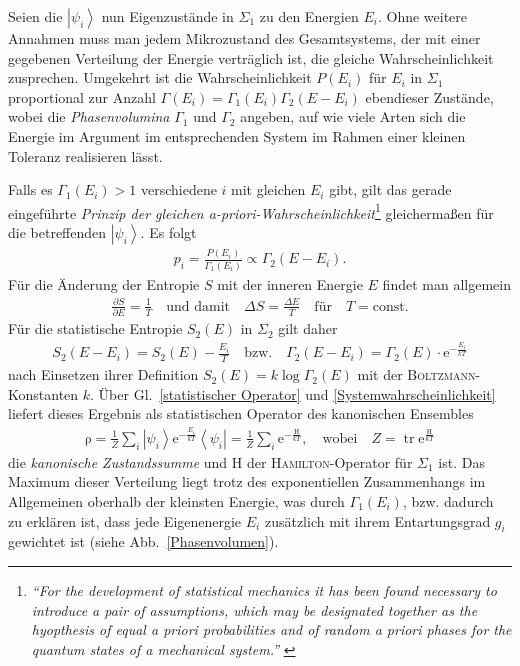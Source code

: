 \documentclass[a4paper, 10pt, twoside, openany]{book} %
\newcommand \bra[1]{\left \langle #1 \right |}
\newcommand \ket[1]{\left | #1 \right \rangle}
\def \E {\mathrm e}
\newcommand \op[1]{\mathrm{#1}}
\newcommand \pdiff[2]{\frac{\partial #1}{\partial #2}}
\begin{document}
Seien die $\ket{\psi_i}$ nun Eigenzustände in $\Sigma_1$ zu den Energien $E_i$. Ohne weitere Annahmen muss man jedem Mikrozustand des Gesamtsystems, der mit einer gegebenen Verteilung der Energie verträglich ist, die gleiche Wahrscheinlichkeit zusprechen. Umgekehrt ist die Wahrscheinlichkeit $P(E_i)$ für $E_i$ in $\Sigma_1$ proportional zur Anzahl $\mathit \Gamma(E_i) = \mathit \Gamma_1(E_i) \mathit \Gamma_2(E - E_i)$ ebendieser Zustände, wobei die \emph{Phasenvolumina} $\mathit \Gamma_1$ und $\mathit \Gamma_2$ angeben, auf wie viele Arten sich die Energie im Argument im entsprechenden System im Rahmen einer kleinen Toleranz realisieren lässt.

Falls es $\Gamma_1(E_i) > 1$ verschiedene $i$ mit gleichen $E_i$ gibt, gilt das gerade eingeführte \emph{Prinzip der gleichen a-priori-Wahrscheinlichkeit}\footnote{\emph{"`For the development of statistical mechanics it has been found necessary to introduce a pair of assumptions, which may be designated together as the hyopthesis of \emph{equal} a priori \emph{probabilities and of random} a priori \emph{phases} for the quantum states of a mechanical system."'} \cite[S.~4]{Tolman}} gleichermaßen für die betreffenden $\ket{\psi_i}$. Es folgt
%
\begin{align}
    p_i = \frac{P(E_i)}{\mathit \Gamma_1(E_i)} \propto \Gamma_2(E - E_i).
    \label{Systemwahrscheinlichkeit}
\end{align}
%
Für die Änderung der Entropie $S$ mit der inneren Energie $E$ findet man allgemein
%
\begin{align*}
    \pdiff S E = \frac 1 T \quad \text{und damit} \quad \Delta S = \frac {\Delta E} T \quad \text{für} \quad T = \text{const.}
\end{align*}
%
Für die statistische Entropie $S_2(E)$ in $\Sigma_2$ gilt daher
%
\begin{align*}
    S_2(E - E_i) = S_2(E) - \frac {E_i} T \quad \text{bzw.} \quad \Gamma_2(E - E_i) = \Gamma_2(E) \cdot \E^{-\frac{E_i}{k T}}
\end{align*}
%
nach Einsetzen ihrer Definition $S_2(E) = k \log \Gamma_2(E)$ mit der \textsc{Boltzmann}-Konstanten $k$. Über Gl.~\ref{statistischer Operator} und \ref{Systemwahrscheinlichkeit} liefert dieses Ergebnis als statistischen Operator des kanonischen Ensembles
%
\begin{align*}
    \op \rho = \frac 1 Z \sum_i \ket{\psi_i} \E^{-\frac{E_i}{k T}} \bra{\psi_i} = \frac 1 Z \sum_i \E^{-\frac{\op H}{k T}}, \quad \text{wobei} \quad Z = \operatorname{tr} \E^{\frac{\op H}{k T}}
\end{align*}
%
die \emph{kanonische Zustandssumme} und $\op H$ der \textsc{Hamilton}-Operator für $\Sigma_1$ ist. Das Maximum dieser Verteilung liegt trotz des exponentiellen Zusammenhangs im Allgemeinen oberhalb der kleinsten Energie, was durch $\mathit \Gamma_1(E_i)$, bzw. dadurch zu erklären ist, dass jede Eigenenergie $E_i$ zusätzlich mit ihrem Entartungsgrad $g_i$ gewichtet ist (siehe Abb.~\ref{Phasenvolumen}).
\end{document}
